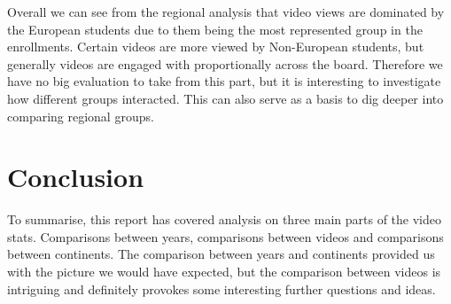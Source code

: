 \documentclass[
]{article}
\begin{document}
Overall we can see from the regional analysis that video views are
dominated by the European students due to them being the most
represented group in the enrollments. Certain videos are more viewed by
Non-European students, but generally videos are engaged with
proportionally across the board. Therefore we have no big evaluation to
take from this part, but it is interesting to investigate how different
groups interacted. This can also serve as a basis to dig deeper into
comparing regional groups.

\hypertarget{conclusion}{%
\section{Conclusion}\label{conclusion}}

To summarise, this report has covered analysis on three main parts of
the video stats. Comparisons between years, comparisons between videos
and comparisons between continents. The comparison between years and
continents provided us with the picture we would have expected, but the
comparison between videos is intriguing and definitely provokes some
interesting further questions and ideas.
\end{document}
